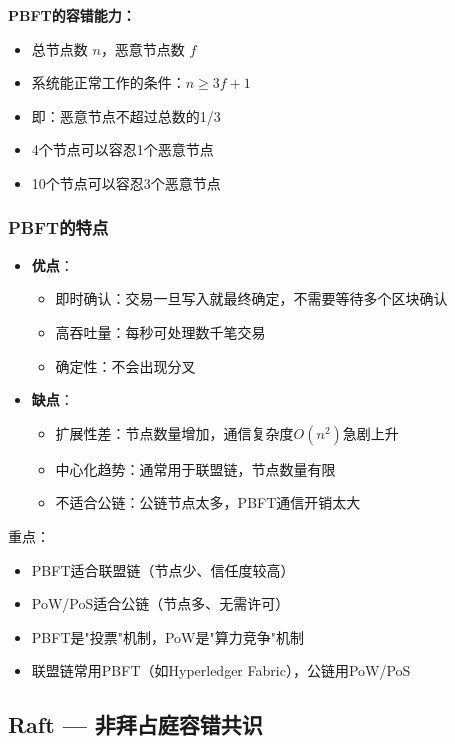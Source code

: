 ﻿\documentclass[12pt,a4paper]{article}
\begin{document}
\begin{theorybox}
\textbf{PBFT的容错能力：}
\begin{itemize}
\item 总节点数 $n$，恶意节点数 $f$
\item 系统能正常工作的条件：$n \geq 3f + 1$
\item 即：恶意节点不超过总数的1/3
\item 4个节点可以容忍1个恶意节点
\item 10个节点可以容忍3个恶意节点
\end{itemize}
\end{theorybox}

\subsubsection{PBFT的特点}

\begin{itemize}[leftmargin=1.5em]
\item \textbf{优点}：
  \begin{itemize}
  \item 即时确认：交易一旦写入就最终确定，不需要等待多个区块确认
  \item 高吞吐量：每秒可处理数千笔交易
  \item 确定性：不会出现分叉
  \end{itemize}
\item \textbf{缺点}：
  \begin{itemize}
  \item 扩展性差：节点数量增加，通信复杂度$O(n^2)$急剧上升
  \item 中心化趋势：通常用于联盟链，节点数量有限
  \item 不适合公链：公链节点太多，PBFT通信开销太大
  \end{itemize}
\end{itemize}

\begin{keypointbox}
重点：
\begin{itemize}
\item PBFT适合联盟链（节点少、信任度较高）
\item PoW/PoS适合公链（节点多、无需许可）
\item PBFT是"投票"机制，PoW是"算力竞争"机制
\item 联盟链常用PBFT（如Hyperledger Fabric），公链用PoW/PoS
\end{itemize}
\end{keypointbox}

\subsection{Raft — 非拜占庭容错共识}
\end{document}
